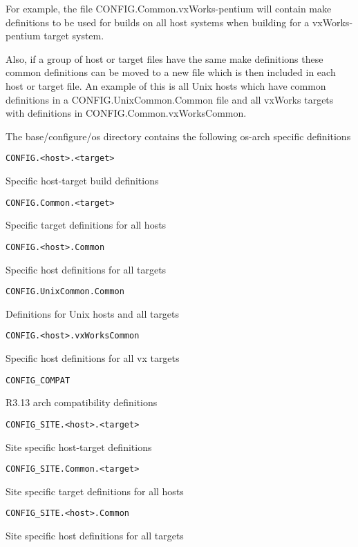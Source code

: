 For example, the file CONFIG.Common.vxWorks-pentium will contain make definitions to be used for builds on all host 
systems when building for a vxWorks-pentium target system.

Also, if a group of host or target files have the same make definitions these common definitions can be moved to a new 
file which is then included in each host or target file. An example of this is all Unix hosts which have common definitions 
in a CONFIG.UnixCommon.Common file and all vxWorks targets with definitions in 
CONFIG.Common.vxWorksCommon.

The base/configure/os directory contains the following os-arch specific definitions

\begin{description}

\item {}\verb|CONFIG.<host>.<target>|

Specific host-target build definitions

\item {}\verb|CONFIG.Common.<target>|

Specific target definitions for all hosts

\item {}\verb|CONFIG.<host>.Common|

Specific host definitions for all targets

\item {}\verb|CONFIG.UnixCommon.Common|

Definitions for Unix hosts and all targets

\item {}\verb|CONFIG.<host>.vxWorksCommon|

Specific host definitions for all vx targets

\item {}\verb|CONFIG_COMPAT|

R3.13 arch compatibility definitions

\item {}\verb|CONFIG_SITE.<host>.<target>|

Site specific host-target definitions

\item {}\verb|CONFIG_SITE.Common.<target>|

Site specific target definitions for all hosts

\item {}\verb|CONFIG_SITE.<host>.Common|

Site specific host definitions for all targets

\end{description}


